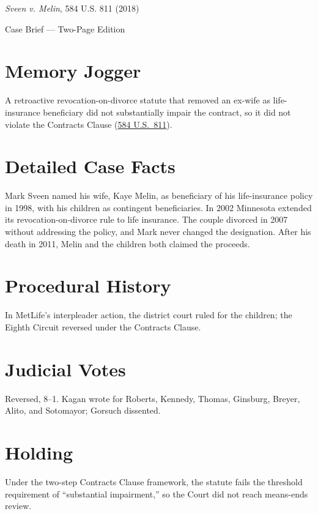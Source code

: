 \documentclass[12pt]{article}
\begin{document}
\begin{center}
{\LARGE \textit{Sveen v. Melin}, 584 U.S. 811 (2018)\par}
\vspace{0.5em}
{\large Case Brief --- Two-Page Edition\par}
\end{center}

\section{Memory Jogger}
A retroactive revocation-on-divorce statute that removed an ex-wife as life-insurance beneficiary did not substantially impair the contract, so it did not violate the Contracts Clause (\href{https://supreme.justia.com/cases/federal/us/584/16-1432/}{584 U.S.\ 811}).

\section{Detailed Case Facts}
Mark Sveen named his wife, Kaye Melin, as beneficiary of his life-insurance policy in 1998, with his children as contingent beneficiaries. In 2002 Minnesota extended its revocation-on-divorce rule to life insurance. The couple divorced in 2007 without addressing the policy, and Mark never changed the designation. After his death in 2011, Melin and the children both claimed the proceeds.

\section{Procedural History}
In MetLife's interpleader action, the district court ruled for the children; the Eighth Circuit reversed under the Contracts Clause.

\section{Judicial Votes}
Reversed, 8--1. Kagan wrote for Roberts, Kennedy, Thomas, Ginsburg, Breyer, Alito, and Sotomayor; Gorsuch dissented.

\section{Holding}
Under the two-step Contracts Clause framework, the statute fails the threshold requirement of ``substantial impairment,'' so the Court did not reach means-ends review.
\end{document}
